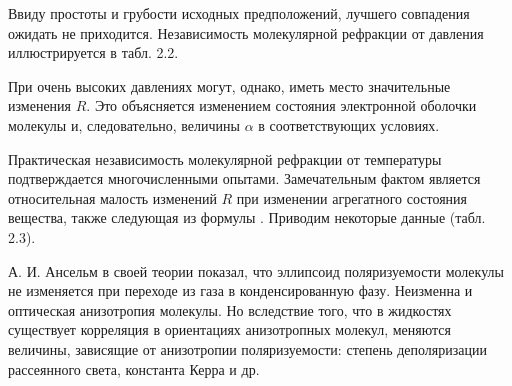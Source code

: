 Ввиду простоты и грубости исходных предположений, лучшего
совпадения ожидать не приходится. Независимость молекулярной
рефракции от давления иллюстрируется в табл. 2.2. 
\begin{figure}[tbp]

\hbox{\vbox{}} 
\end{figure}

При очень высоких давлениях могут, однако, иметь место
значительные изменения $R$. Это объясняется изменением состояния
электронной оболочки молекулы и, следовательно, величины $\alpha$
в соответствующих условиях.

Практическая независимость молекулярной рефракции от температуры
подтверждается многочисленными опытами. Замечательным фактом
является относительная малость изменений $R$ при изменении
агрегатного состояния вещества, также следующая из формулы
. Приводим некоторые данные (табл. 2.3).

А. И. Ансельм в своей теории показал, что эллипсоид поляризуемости
молекулы не изменяется при переходе из газа в конденсированную
фазу. Неизменна и оптическая анизотропия молекулы. Но вследствие
того, что в жидкостях существует корреляция в ориентациях
анизотропных молекул, меняются величины, зависящие от анизотропии
поляризуемости: степень деполяризации рассеянного света, константа
Керра и др. 
\begin{figure}[tbp]

\hbox{\vbox{}} 
\end{figure}

